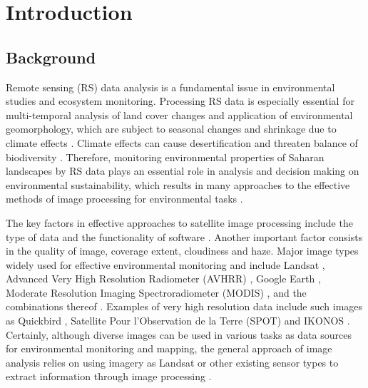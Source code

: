 \documentclass[land,article,submit,pdftex,moreauthors]{Definitions/mdpi}
\begin{document}
\section{Introduction}

\subsection{Background}

Remote sensing (RS) data analysis is a fundamental issue in environmental studies and ecosystem monitoring. Processing RS data is especially essential for multi-temporal analysis of land cover changes \cite{BOUSSETTA2022102564} and application of environmental geomorphology, which are subject to seasonal changes and shrinkage due to climate effects \cite{JonesMillington}. Climate effects can cause desertification \cite{Pontanier,info14040249} and threaten balance of biodiversity \cite{YAICHEACHOUR2023501}. Therefore, monitoring environmental properties of Saharan landscapes by RS data plays an essential role in analysis and decision making on environmental sustainability, which results in many approaches to the effective methods of image processing for environmental tasks \cite{Monget,Lemenkova202227,CAMPOS2018211}. 

The key factors in effective approaches to satellite image processing include the type of data and the functionality of software \cite{rs14236017}. Another important factor consists in the quality of image, coverage extent, cloudiness and haze. Major image types widely used for effective environmental monitoring and include Landsat \cite{BOUSSEMA2023185,SMIDA2022104643,jmse11040871}, Advanced Very High Resolution Radiometer (AVHRR) \cite{Bryant}, Google Earth \cite{LI2022252}, Moderate Resolution Imaging Spectroradiometer (MODIS) \cite{TOUHAMI2022103804,RHIF2022101596}, and the combinations thereof \cite{REBILLARD1984133}. Examples of very high resolution data include such images as Quickbird \cite{CHOUARI2021443}, Satellite Pour l’Observation de la Terre (SPOT) and IKONOS \cite{VELA2008591}. Certainly, although diverse images can be used in various tasks as data sources for environmental monitoring and mapping, the general approach of image analysis relies on using imagery as Landsat or other existing sensor types to extract information through image processing \cite{LiangWang}. 
\end{document}
